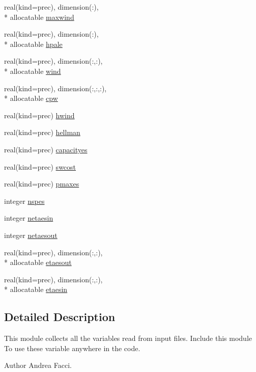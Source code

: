 \begin{DoxyCompactItemize}
\item 
real(kind=prec), dimension(\-:), \\*
allocatable \hyperlink{classinputvar_a42a243861fa635356cdd79a587633909}{maxwind}
\item 
real(kind=prec), dimension(\-:), \\*
allocatable \hyperlink{classinputvar_a1a0e84530e6db6a46aabfcea51b086bf}{hpale}
\item 
real(kind=prec), dimension(\-:,\-:), \\*
allocatable \hyperlink{classinputvar_a984abc6260080087c3c555784481627d}{wind}
\item 
real(kind=prec), dimension(\-:,\-:,\-:), \\*
allocatable \hyperlink{classinputvar_aa5889e6180140933c4866b2e05765458}{cpw}
\item 
real(kind=prec) \hyperlink{classinputvar_aef589b7d9f863ca157c6d7921781fe58}{hwind}
\item 
real(kind=prec) \hyperlink{classinputvar_ad9ba538cb5982defe216a14bc80bf73e}{hellman}
\item 
real(kind=prec) \hyperlink{classinputvar_a4160798c67ffa5c237c6a3febf2eb38f}{capacityes}
\item 
real(kind=prec) \hyperlink{classinputvar_aa9cd3592e06c1cfdc7fee2caf5b13d1f}{swcost}
\item 
real(kind=prec) \hyperlink{classinputvar_a424224e3c5687c72c624fa212df200b4}{pmaxes}
\item 
integer \hyperlink{classinputvar_a253d7296c6c1f21cd53ed05721bcbbc3}{nspes}
\item 
integer \hyperlink{classinputvar_a5ded7ede4ce21d0a98a8055d9af0d827}{netaesin}
\item 
integer \hyperlink{classinputvar_ae8e6041b9d65c592b4ac141f652ca7e0}{netaesout}
\item 
real(kind=prec), dimension(\-:,\-:), \\*
allocatable \hyperlink{classinputvar_a3fdfebac3bb028ed7664d1bc4075855f}{etaesout}
\item 
real(kind=prec), dimension(\-:,\-:), \\*
allocatable \hyperlink{classinputvar_a1456f5042efdddbb5170fa662434c5a5}{etaesin}
\end{DoxyCompactItemize}


\subsection{Detailed Description}
This module collects all the variables read from input files. Include this module To use these variable anywhere in the code. \begin{DoxyAuthor}{Author}
Andrea Facci. 
\end{DoxyAuthor}


